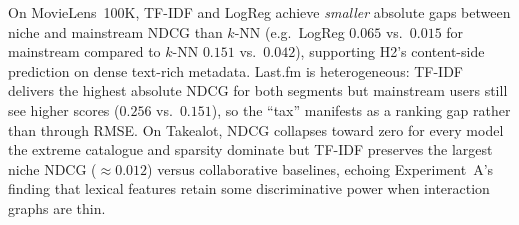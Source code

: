 \begin{table}[htbp]
  \centering
  \caption{Mean NDCG@10 for niche (N) and mainstream (M) tertiles. ``Book-X'' denotes Book-Crossing. Takealot appended from \texttt{user\_centric\_metrics\_take-a-lot-dataset.csv}.}
  \label{tab:uc-ndcg}
\end{table}

On MovieLens~100K, TF-IDF and LogReg achieve \emph{smaller} absolute gaps between niche and mainstream NDCG than $k$-NN (e.g.\ LogReg $0.065$ vs.\ $0.015$ for mainstream compared to $k$-NN $0.151$ vs.\ $0.042$), supporting H2's content-side prediction on dense text-rich metadata. Last.fm is heterogeneous: TF-IDF delivers the highest absolute NDCG for both segments but mainstream users still see higher scores ($0.256$ vs.\ $0.151$), so the ``tax'' manifests as a ranking gap rather than through RMSE. On Takealot, NDCG collapses toward zero for every model the extreme catalogue and sparsity dominate but TF-IDF preserves the largest niche NDCG ($\approx 0.012$) versus collaborative baselines, echoing Experiment~A's finding that lexical features retain some discriminative power when interaction graphs are thin.

